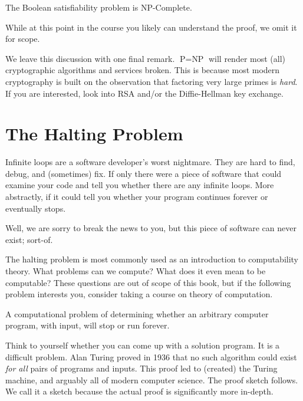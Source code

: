 \documentclass[main.tex]{subfiles}
\begin{document}
\begin{thm}
	The Boolean satisfiability problem is NP-Complete.
\end{thm}

\begin{rem}
	While at this point in the course you likely can understand the proof, we omit it for scope.
\end{rem}

We leave this discussion with one final remark.
\(\text{P}=\text{NP}\) will render most (all) cryptographic algorithms and services broken.
This is because most modern cryptography is built on the observation that factoring very large primes is \textit{hard}.
If you are interested, look into RSA and/or the Diffie-Hellman key exchange.

\section{The Halting Problem}

Infinite loops are a software developer's worst nightmare. They are hard to find, debug, and (sometimes) fix. If only there were a piece of software that could examine your code and tell you whether there are any infinite loops. More abstractly, if it could tell you whether your program continues forever or eventually stops.

Well, we are sorry to break the news to you, but this piece of software can never exist; sort-of.

The halting problem is most commonly used as an introduction to computability theory. What problems can we compute? What does it even mean to be computable? These questions are out of scope of this book, but if the following problem interests you, consider taking a course on theory of computation.

\begin{defn}
	A computational problem of determining whether an arbitrary computer program, with input, will stop or run forever.
\end{defn}

Think to yourself whether you can come up with a solution program. It is a difficult problem. Alan Turing proved in 1936 that no such algorithm could exist \textit{for all} pairs of programs and inputs. This proof led to (created) the Turing machine, and arguably all of modern computer science. The proof sketch follows. We call it a sketch because the actual proof is significantly more in-depth.
\end{document}
